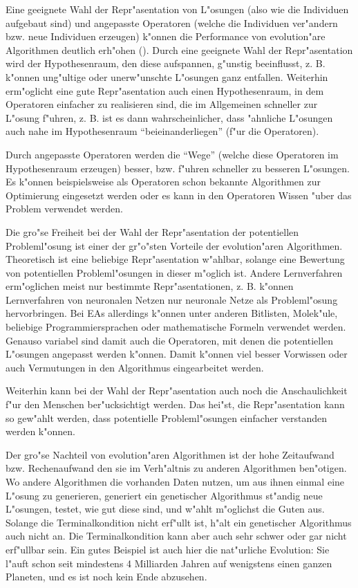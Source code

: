 Eine geeignete Wahl der Repr"asentation von L"osungen (also wie die Individuen aufgebaut sind) und angepasste Operatoren (welche die Individuen ver"andern bzw. neue Individuen erzeugen) k"onnen die Performance von evolution"are Algorithmen deutlich erh"ohen (\cite{ECDF00}).
Durch eine geeignete Wahl der Repr"asentation wird der Hypothesenraum, den diese aufspannen, g"unstig beeinflusst, z. B. k"onnen ung"ultige oder unerw"unschte L"osungen ganz entfallen. Weiterhin erm"oglicht eine gute Repr"asentation auch einen Hypothesenraum, in dem Operatoren einfacher zu realisieren sind, die im Allgemeinen schneller zur L"osung f"uhren, z. B. ist es dann wahrscheinlicher, dass "ahnliche L"osungen auch nahe im Hypothesenraum ``beieinanderliegen'' (f"ur die Operatoren).

Durch angepasste Operatoren werden die ``Wege'' (welche diese Operatoren im Hypothesenraum erzeugen) besser, bzw. f"uhren schneller zu besseren L"osungen. Es k"onnen beispielsweise als Operatoren schon bekannte Algorithmen zur Optimierung eingesetzt werden oder es kann in den Operatoren Wissen "uber das Problem verwendet werden.

Die gro"se Freiheit bei der Wahl der Repr"asentation der potentiellen Probleml"osung ist einer der gr"o"sten Vorteile der evolution"aren Algorithmen. Theoretisch ist eine beliebige Repr"asentation w"ahlbar, solange eine Bewertung von potentiellen Probleml"osungen in dieser m"oglich ist. Andere Lernverfahren erm"oglichen meist nur bestimmte Repr"asentationen, z. B. k"onnen Lernverfahren von neuronalen Netzen nur neuronale Netze als Probleml"osung hervorbringen. Bei EAs allerdings k"onnen unter anderen Bitlisten, Molek"ule, beliebige Programmiersprachen oder mathematische Formeln verwendet werden. Genauso variabel sind damit auch die Operatoren, mit denen die potentiellen L"osungen angepasst werden k"onnen. Damit k"onnen viel besser Vorwissen oder auch Vermutungen in den Algorithmus eingearbeitet werden.

Weiterhin kann bei der Wahl der Repr"asentation auch noch die Anschaulichkeit f"ur den Menschen ber"ucksichtigt werden. Das hei"st, die Repr"asentation kann so gew"ahlt werden, dass potentielle Probleml"osungen einfacher verstanden werden k"onnen.

Der gro"se Nachteil von evolution"aren Algorithmen ist der hohe Zeitaufwand bzw. Rechenaufwand den sie im Verh"altnis zu anderen Algorithmen ben"otigen. Wo andere Algorithmen die vorhanden Daten nutzen, um aus ihnen einmal eine L"osung zu generieren, generiert ein genetischer Algorithmus st"andig neue L"osungen, testet, wie gut diese sind, und w"ahlt m"oglichst die Guten aus. Solange die Terminalkondition nicht erf"ullt ist, h"alt ein genetischer Algorithmus auch nicht an. Die Terminalkondition kann aber auch sehr schwer oder gar nicht erf"ullbar sein. Ein gutes Beispiel ist auch hier die nat"urliche Evolution: Sie l"auft schon seit mindestens 4 Milliarden Jahren auf wenigstens einen ganzen Planeten, und es ist noch kein Ende abzusehen.


